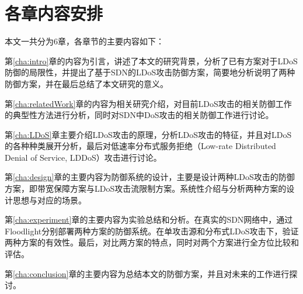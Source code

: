 \section{各章内容安排}
\label{sec:arrange}
本文一共分为6章，各章节的主要内容如下：

第\ref{cha:intro}章的内容为引言，讲述了本文的研究背景，分析了已有方案对于LDoS防御的局限性，并提出了基于SDN的LDoS攻击防御方案，简要地分析说明了两种防御方案，并在最后总结了本文研究的意义。

第\ref{cha:relatedWork}章的内容为相关研究介绍，对目前LDoS攻击的相关防御工作的典型性方法进行分析，同时对SDN中DoS攻击的相关防御工作进行讨论。

第\ref{cha:LDoS}章主要介绍LDoS攻击的原理，分析LDoS攻击的特征，并且对LDoS的各种种类展开分析，最后对低速率分布式服务拒绝（Low-rate Distributed Denial of Service, LDDoS）攻击进行讨论。

第\ref{cha:design}章的主要内容为防御系统的设计，主要是设计两种LDoS攻击的防御方案，即带宽保障方案与LDoS攻击流限制方案。系统性介绍与分析两种方案的设计思想与对应的场景。

第\ref{cha:experiment}章的主要内容为实验总结和分析。在真实的SDN网络中，通过Floodlight分别部署两种方案的防御系统。在单攻击源和分布式LDoS攻击下，验证两种方案的有效性。最后，对比两方案的特点，同时对两个方案进行全方位比较和评估。

第\ref{cha:conclusion}章的主要内容为总结本文的防御方案，并且对未来的工作进行探讨。